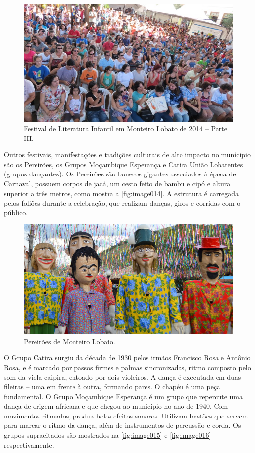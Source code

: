  \begin{figure}[h!]
	\centering
	\includegraphics[width=0.75\linewidth]{produtos/proddois/image013}
	\caption{Festival de Literatura Infantil em Monteiro Lobato de 2014 – Parte III.}
	\label{fig:image013}
\end{figure}

Outros festivais, manifestações e tradições culturais de alto impacto no munícipio são os Pereirões, os Grupos Moçambique Esperança e Catira União Lobatentes (grupos dançantes). Os Pereirões são bonecos gigantes associados à época de Carnaval, possuem corpos de jacá, um cesto feito de bambu e cipó e altura superior a três metros, como mostra a \autoref{fig:image014}. A estrutura é carregada pelos foliões durante a celebração, que realizam danças, giros e corridas com o público.


 \begin{figure}[!h]
	\centering
	\includegraphics[width=0.75\linewidth]{produtos/proddois/image014}
	\caption{Pereirões de Monteiro Lobato.}
	\label{fig:image014}
\end{figure}

O Grupo Catira surgiu da década de 1930 pelos irmãos Francisco Rosa e Antônio Rosa, e é marcado por passos firmes e palmas sincronizadas, ritmo composto pelo som da viola caipira, entoado por dois violeiros. A dança é executada em duas fileiras – uma em frente à outra, formando pares. O chapéu é uma peça fundamental. O Grupo Moçambique Esperança é um grupo que repercute uma dança de origem africana e que chegou ao município no ano de 1940. Com movimentos ritmados, produz belos efeitos sonoros. Utilizam bastões que servem para marcar o ritmo da dança, além de instrumentos de percussão e corda. Os grupos supracitados são mostrados na \autoref{fig:image015} e \autoref{fig:image016} respectivamente.



